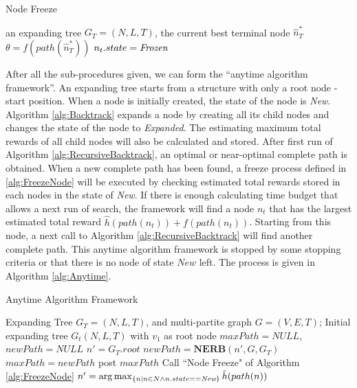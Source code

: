 \begin{algorithm}
\caption{Node Freeze}
\label{alg:FreezeNode}
\begin{algorithmic}[1]
\REQUIRE 
an expanding tree $ G_{T} = (N, L, T) $, the current best terminal node $ \hat{n}^{*}_{T} $
\STATE $ \theta = f(path(\hat{n}^{*}_{T})) $
\STATE $ n_{t}.state = \mbox{\emph{Frozen}} $
\ENDIF
\ENDFOR
\end{algorithmic}
\end{algorithm}

After all the sub-procedures given, we can form the ``anytime algorithm framework''.
An expanding tree starts from a structure with only a root node - start position.
When a node is initially created, the state of the node is \emph{New}.
Algorithm \ref{alg:Backtrack} expands a node by creating all its child nodes and changes the state of the node to \emph{Expanded}.
The estimating maximum total rewards of all child nodes will also be calculated and stored.
After first run of Algorithm \ref{alg:RecursiveBacktrack}, an optimal or near-optimal complete path is obtained.
When a new complete path has been found, a freeze process defined in \ref{alg:FreezeNode} will be executed by checking estimated total rewards stored in each nodes in the state of \emph{New}.
If there is enough calculating time budget that allows a next run of search, the framework will find a node $ n_{t} $ that has the largest estimated total reward $ \hat{h}(path(n_{t})) + f(path(n_{t})) $.
Starting from this node, a next call to Algorithm \ref{alg:RecursiveBacktrack} will find another complete path.
This anytime algorithm framework is stopped by some stopping criteria or that there is no node of state $ New $ left.
The process is given in Algorithm \ref{alg:Anytime}.

\begin{algorithm}
\caption{Anytime Algorithm Framework}
\label{alg:Anytime}
\begin{algorithmic}[1]
\REQUIRE 
Expanding Tree $ G_{T} = (N, L, T) $, and multi-partite graph $ G = (V, E, T) $;
\STATE Initial expanding tree $ G_{t}(N, L, T) $ with $ v_{1} $ as root node
\STATE $ maxPath = NULL $, $ newPath = NULL $
\STATE $ n' = G_{T}.root $
\STATE $ newPath = \mathbf{NERB}( n', G, G_{T} ) $
\STATE $ maxPath = newPath $
\STATE post $ maxPath $
\ENDIF
\STATE Call ``Node Freeze" of Algorithm \ref{alg:FreezeNode}
\STATE $ n' = \arg \max_{ \{n \mid n \in N \land n.state == \mbox{\emph{New}} \} } \hat{h}(path(n)) $
\ENDWHILE 
\end{algorithmic}
\end{algorithm}

